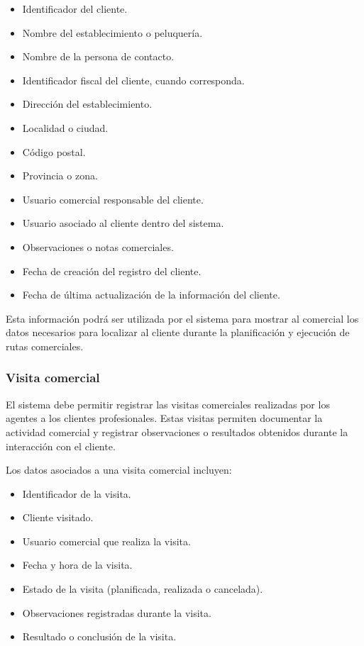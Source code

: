 \begin{itemize}
    \item Identificador del cliente.
    \item Nombre del establecimiento o peluquería.
    \item Nombre de la persona de contacto.
    \item Identificador fiscal del cliente, cuando corresponda.
    \item Dirección del establecimiento.
    \item Localidad o ciudad.
    \item Código postal.
    \item Provincia o zona.
    \item Usuario comercial responsable del cliente.
    \item Usuario asociado al cliente dentro del sistema.
    \item Observaciones o notas comerciales.
    \item Fecha de creación del registro del cliente.
    \item Fecha de última actualización de la información del cliente.
\end{itemize}

Esta información podrá ser utilizada por el sistema para mostrar al comercial los datos necesarios para localizar al cliente durante la planificación y ejecución de rutas comerciales.

\subsubsection*{Visita comercial}

El sistema debe permitir registrar las visitas comerciales realizadas por los agentes a los clientes profesionales. Estas visitas permiten documentar la actividad comercial y registrar observaciones o resultados obtenidos durante la interacción con el cliente.

Los datos asociados a una visita comercial incluyen:

\begin{itemize}
    \item Identificador de la visita.
    \item Cliente visitado.
    \item Usuario comercial que realiza la visita.
    \item Fecha y hora de la visita.
    \item Estado de la visita (planificada, realizada o cancelada).
    \item Observaciones registradas durante la visita.
    \item Resultado o conclusión de la visita.
\end{itemize}

